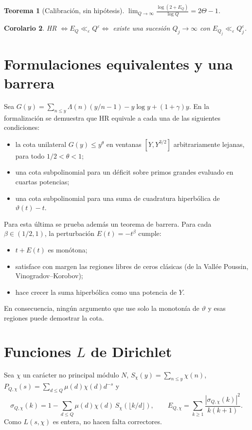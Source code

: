 \documentclass[11pt,a4paper]{amsart}
\newtheorem{teorema}{Teorema}
\newtheorem{corolario}[teorema]{Corolario}
\theoremstyle{definition}
\theoremstyle{remark}
\begin{document}
\begin{teorema}[Calibraci\'on, sin hip\'otesis]\label{teo:calibracion}
$\displaystyle\lim_{Q\to\infty}\frac{\log(2+E_Q)}{\log Q}=2\Theta-1$.
\end{teorema}

\begin{corolario}
HR $\iff E_Q\ll_\varepsilon Q^\varepsilon\iff$ existe una sucesi\'on $Q_j\to\infty$ con $E_{Q_j}\ll_\varepsilon Q_j^\varepsilon$.
\end{corolario}

\section{Formulaciones equivalentes y una barrera}\label{sec:equiv}

Sea $G(y)=\sum_{n\le y}\Lambda(n)(y/n-1)-y\log y+(1+\gamma)y$. En la formalizaci\'on se demuestra que HR equivale a cada una de las siguientes condiciones:
\begin{itemize}
\item la cota unilateral $G(y)\le y^\theta$ en ventanas $[Y,Y^{3/2}]$ arbitrariamente lejanas, para todo $1/2<\theta<1$;
\item una cota subpolinomial para un d\'eficit sobre primos grandes evaluado en cuartas potencias;
\item una cota subpolinomial para una suma de cuadratura hiperb\'olica de $\vartheta(t)-t$.
\end{itemize}
Para esta \'ultima se prueba adem\'as un teorema de barrera. Para cada $\beta\in(1/2,1)$, la perturbaci\'on $E(t)=-t^\beta$ cumple:
\begin{itemize}
\item $t+E(t)$ es mon\'otona;
\item satisface con margen las regiones libres de ceros cl\'asicas (de la Vall\'ee Poussin, Vinogradov--Korobov);
\item hace crecer la suma hiperb\'olica como una potencia de $Y$.
\end{itemize}
En consecuencia, ning\'un argumento que use solo la monoton\'ia de $\vartheta$ y esas regiones puede demostrar la cota.

\section{Funciones $L$ de Dirichlet}\label{sec:dirichlet}

Sea $\chi$ un car\'acter no principal m\'odulo $N$, $S_\chi(y)=\sum_{n\le y}\chi(n)$, $P_{Q,\chi}(s)=\sum_{d\le Q}\mu(d)\chi(d)d^{-s}$ y
\[
\sigma_{Q,\chi}(k)=1-\sum_{d\le Q}\mu(d)\chi(d)\,S_\chi(\lfloor k/d\rfloor),\qquad
E_{Q,\chi}=\sum_{k\ge1}\frac{|\sigma_{Q,\chi}(k)|^2}{k(k+1)}.
\]
Como $L(s,\chi)$ es entera, no hacen falta correctores.
\end{document}
